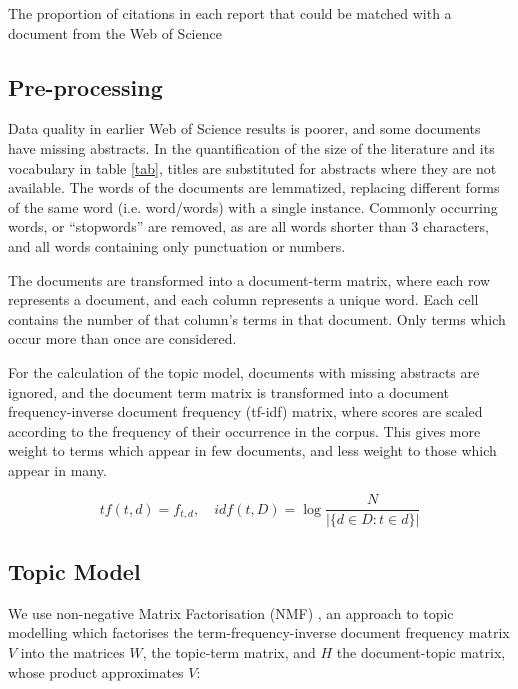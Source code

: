 \documentclass{article}
\begin{document}
\begin{linenumbers}
		\begin{table}[htp]
			\begin{center}
				
				\caption{The proportion of citations in each report that could be matched with a document from the Web of Science}
				\label{ipcc-matching}
			\end{center}
		\end{table}
		
		
		\subsection*{Pre-processing}
		
		Data quality in earlier Web of Science results is poorer, and some documents have missing abstracts. In the quantification of the size of the literature and its vocabulary in table \ref{tab}, titles are substituted for abstracts where they are not available.  The words of the documents are lemmatized, replacing different forms of the same word (i.e. word/words) with a single instance. Commonly occurring words, or ``stopwords'' are removed, as are all words shorter than 3 characters, and all words containing only punctuation or numbers.
		
		The documents are transformed into a document-term matrix, where each row represents a document, and each column represents a unique word.  Each cell contains the number of that column's terms in that document. Only terms which occur more than once are considered.
		
		For the calculation of the topic model, documents with missing abstracts are ignored, and the document term matrix is transformed into a document
		frequency-inverse document frequency (tf-idf) matrix, where scores are scaled according to the frequency of their occurrence in the corpus. This gives more weight to terms which appear in few documents, and less weight to those which appear in many.
		
		\begin{equation}
		tf(t,d) = f_{t,d} \mathrm{,}\quad idf(t,D) = \log\frac{N}{|\{d \in D:t \in d\}|}
		\end{equation} 
		
		\subsection*{Topic Model}
		
		We use non-negative Matrix Factorisation (NMF) \cite{Lee1999}, an approach to topic modelling which factorises the term-frequency-inverse document frequency matrix \( V \) into the matrices \(W\), the topic-term matrix, and \( H \) the document-topic matrix, whose product approximates \(V\):
		

\end{linenumbers}
\end{document}
